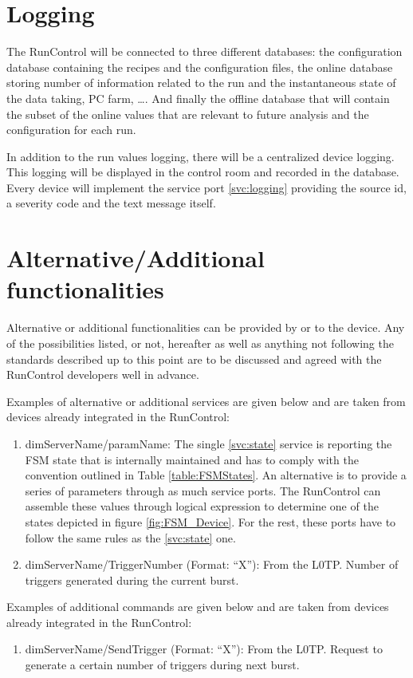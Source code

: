 \documentclass[a4paper]{article}
\begin{document}
\section{Logging}\label{sec:logging}
The RunControl will be connected to three different databases: the configuration database containing
the recipes and the configuration files, the online database storing number of information related
to the run and the instantaneous state of the data taking, PC farm, \ldots. And finally the offline
database that will contain the subset of the online values that are relevant to future analysis and
the configuration for each run.

In addition to the run values logging, there will be a centralized device logging. This logging will
be displayed in the control room and recorded in the database. Every device will implement the
service port \ref{svc:logging} providing the source id, a severity code and the text message itself.

\section{Alternative/Additional functionalities}
Alternative or additional functionalities can be provided by or to the device. Any of the
possibilities listed, or not, hereafter as well as anything not following the standards described
up to this point are to be discussed and agreed with the RunControl developers well in advance.

Examples of alternative or additional services are given below and are taken from devices already
integrated in the RunControl:
\begin{enumerate}[label=\textbf{ASVC.\arabic*}]
	\item \label{svc:stateParams} dimServerName/paramName: The single \ref{svc:state}
	service is reporting the FSM state that is internally maintained and has to comply with the
	convention outlined in Table \ref{table:FSMStates}. An alternative is to provide a series of
	parameters through as much service ports. The RunControl can assemble these values through logical
	expression to determine one of the states depicted in figure \ref{fig:FSM_Device}. For the rest,
	these ports have to follow the same rules as the \ref{svc:state} one.
	\item dimServerName/TriggerNumber (Format: ``X''): From the L0TP. Number of triggers generated
	during the current burst.
\end{enumerate}

Examples of additional commands are given below and are taken from devices already integrated in
the RunControl:
\begin{enumerate}[label=\textbf{ACMD.\arabic*}]
	\item dimServerName/SendTrigger (Format: ``X''): From the L0TP. Request to generate a certain
	number of triggers during next burst.
\end{enumerate}
\end{document}
